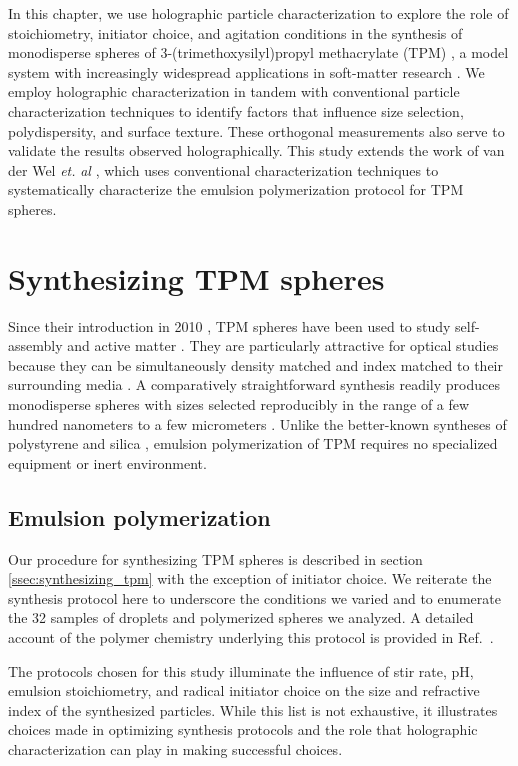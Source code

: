 In this chapter, we use holographic particle characterization
to explore the role of stoichiometry, initiator choice, and
agitation conditions in the synthesis of monodisperse spheres of
3-(trimethoxysilyl)propyl methacrylate (TPM) \cite{vanderwel17},
a model system with increasingly widespread applications
in soft-matter research \cite{sacanna11,liu16,vanderwel18}.
We employ holographic characterization
in tandem with conventional particle characterization
techniques to identify factors that influence size selection, polydispersity,
and surface texture.
These orthogonal measurements also serve to validate the results observed
holographically.
This study extends the work of van der Wel \emph{et.} \emph{al} \cite{vanderwel17}, which
uses conventional characterization techniques to systematically
characterize the emulsion polymerization protocol for TPM spheres.

\section{Synthesizing TPM spheres}

Since their introduction in 2010 \cite{sacanna10}, TPM spheres have been used to
study self-assembly \cite{sacanna13} and active matter \cite{palacci13}.
They are particularly attractive for optical studies because they can be
simultaneously density matched and index matched to their surrounding
media \cite{liu16}.
A comparatively straightforward synthesis readily produces monodisperse spheres
with sizes selected reproducibly in the range of a few hundred nanometers to a
few micrometers \cite{liu16}.
Unlike the better-known syntheses of polystyrene \cite{goodwin1974} and
silica \cite{stober68},
emulsion polymerization of TPM requires no specialized equipment or
inert environment.

\subsection{Emulsion polymerization}
\label{ssec:polymerization}

Our procedure for synthesizing TPM spheres is described in section
\ref{ssec:synthesizing_tpm} with the
exception of initiator choice. We reiterate the synthesis protocol
here to underscore the conditions we varied and to enumerate the
\num{32} samples of droplets and polymerized spheres we analyzed.
A detailed account of the polymer chemistry underlying this
protocol is provided in Ref.~\cite{vanderwel17}.

The protocols chosen for this study illuminate the influence of stir rate, pH,
emulsion stoichiometry, and radical initiator choice on the size and refractive index
of the synthesized particles. While this list is not exhaustive,
it illustrates choices made in optimizing synthesis protocols and the role
that holographic characterization can play in making successful choices.

